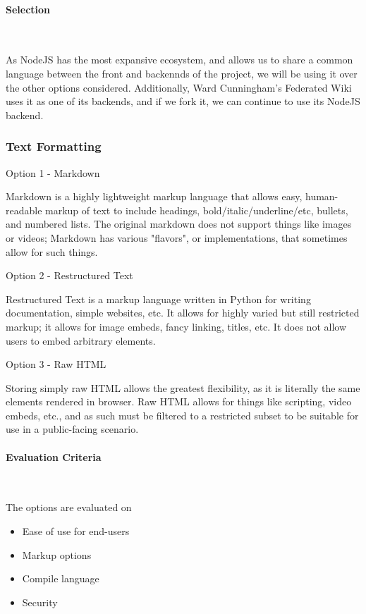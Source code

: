 \documentclass[letterpaper, 10pt, draftclsnofoot, compsoc, onecolumn]{IEEEtran}
\begin{document}
{\medskip
\paragraph{Selection} ~\\
{\noindent As NodeJS has the most expansive ecosystem, and allows us to share a common language between the front and backennds of the project, we will be using it over the other options considered. Additionally, Ward Cunningham's Federated Wiki uses it as one of its backends, and if we fork it, we can continue to use its NodeJS backend. \par}

\newpage
\subsubsection{Text Formatting}
{\noindent \par}
{\noindent Option 1 - Markdown \par}
{\noindent Markdown is a highly lightweight markup language that allows easy, human-readable markup
of text to include headings, bold/italic/underline/etc, bullets, and numbered lists. The original markdown does not support
things like images or videos; Markdown has various "flavors", or implementations, that sometimes
allow for such things. \par}
{\noindent Option 2 - Restructured Text \par}
{\noindent Restructured Text is a markup language written in Python for writing documentation, simple websites,
etc. It allows for highly varied but still restricted markup; it allows for image embeds, fancy linking,
titles, etc. It does not allow users to embed arbitrary elements. \par}
{\noindent Option 3 - Raw HTML \par}
{\noindent Storing simply raw HTML allows the greatest flexibility, as it is literally the same elements
rendered in browser. Raw HTML allows for things like scripting, video embeds, etc., and as such must
be filtered to a restricted subset to be suitable for use in a public-facing scenario. \par}

\medskip
\newpage
\paragraph{Evaluation Criteria} ~\\
{\noindent The options are evaluated on

\begin{itemize}
\item Ease of use for end-users
\item Markup options
\item Compile language
\item Security
\end{itemize}

}}
\end{document}

